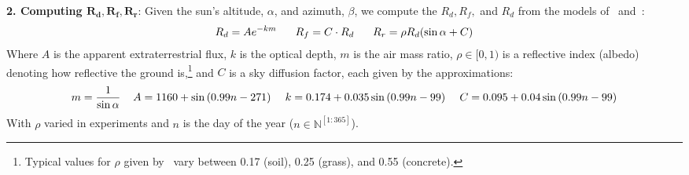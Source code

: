 \documentclass[11pt]{article}
\begin{document}
{\bf 2. Computing $\pmb{R_d, R_f, R_r}$}: Given the sun's altitude, $\alpha$, and azimuth, $\beta$, we compute the $R_d, R_f,$ and $R_d$ from the models of~\citet{threlkeld1957direct,Liu1960} and~\citet{masters2013renewable}:
\begin{align*}
R_d = A e^{-km} \hspace{6mm} R_f = C \cdot R_d \hspace{6mm} R_r = \rho R_d (\sin \alpha + C)
\end{align*}
Where $A$ is the apparent extraterrestrial flux, $k$ is the optical depth, $m$ is the air mass ratio, $\rho \in [0,1)$ is a reflective index (albedo) denoting how reflective the ground is,\footnote{Typical values for $\rho$ given by~\citet{mcevoy2003practical} vary between 0.17 (soil), 0.25 (grass), and 0.55 (concrete).} and $C$ is a sky diffusion factor, each given by the approximations:
\begin{align*}
m = \frac{1}{\sin \alpha} \hspace{4mm} A = 1160 + \sin \left(0.99 n- 271\right) \hspace{4mm} k=0.174 + 0.035 \sin\left( 0.99 n - 99\right) \hspace{4mm} C=0.095 + 0.04 \sin\left(0.99 n-99\right)
\end{align*}
With $\rho$ varied in experiments and $n$ is the day of the year ($n \in \mathbb{N}^{[1:365]}$).
\end{document}
